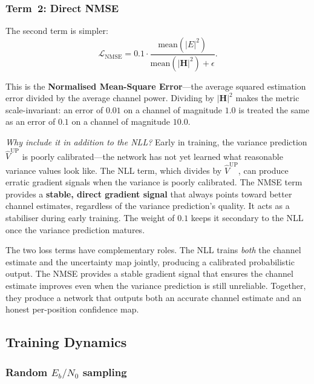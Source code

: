 \documentclass[11pt,a4paper]{article}
\newcommand{\bH}{\mathbf{H}}
\begin{document}
	\subsubsection*{Term~2: Direct NMSE}
	
	The second term is simpler:
	\begin{equation}
		\mathcal{L}_{\mathrm{NMSE}} = 0.1 \cdot \frac{\mathrm{mean}(|E|^2)}{\mathrm{mean}(|\bH|^2) + \epsilon}.
	\end{equation}
	
	This is the \textbf{Normalised Mean-Square Error}---the average squared estimation error divided by the average channel power.  Dividing by $|\bH|^2$ makes the metric scale-invariant: an error of $0.01$ on a channel of magnitude $1.0$ is treated the same as an error of $0.1$ on a channel of magnitude $10.0$.
	
	\emph{Why include it in addition to the NLL?}  Early in training, the variance prediction $\widehat{V}^{\mathrm{UP}}$ is poorly calibrated---the network has not yet learned what reasonable variance values look like.  The NLL term, which divides by $\widehat{V}^{\mathrm{UP}}$, can produce erratic gradient signals when the variance is poorly calibrated.  The NMSE term provides a \textbf{stable, direct gradient signal} that always points toward better channel estimates, regardless of the variance prediction's quality.  It acts as a stabiliser during early training.  The weight of $0.1$ keeps it secondary to the NLL once the variance prediction matures.
	
	\begin{keyidea}
		The two loss terms have complementary roles.  The NLL trains \emph{both} the channel estimate and the uncertainty map jointly, producing a calibrated probabilistic output.  The NMSE provides a stable gradient signal that ensures the channel estimate improves even when the variance prediction is still unreliable.  Together, they produce a network that outputs both an accurate channel estimate and an honest per-position confidence map.
	\end{keyidea}
	
	\subsection{Training Dynamics}
	
	\subsubsection*{Random $E_b/N_0$ sampling}
	
\end{document}

